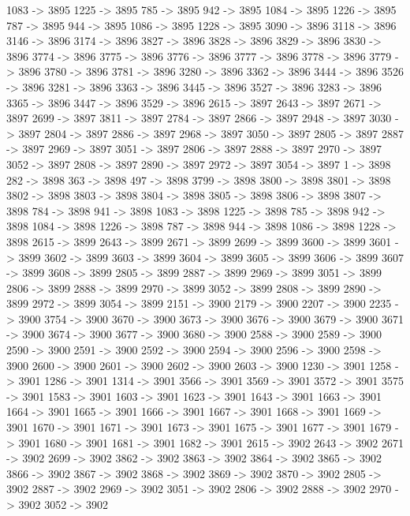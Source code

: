 {	1083 -> 3895
	1225 -> 3895
	785 -> 3895
	942 -> 3895
	1084 -> 3895
	1226 -> 3895
	787 -> 3895
	944 -> 3895
	1086 -> 3895
	1228 -> 3895
	3090 -> 3896
	3118 -> 3896
	3146 -> 3896
	3174 -> 3896
	3827 -> 3896
	3828 -> 3896
	3829 -> 3896
	3830 -> 3896
	3774 -> 3896
	3775 -> 3896
	3776 -> 3896
	3777 -> 3896
	3778 -> 3896
	3779 -> 3896
	3780 -> 3896
	3781 -> 3896
	3280 -> 3896
	3362 -> 3896
	3444 -> 3896
	3526 -> 3896
	3281 -> 3896
	3363 -> 3896
	3445 -> 3896
	3527 -> 3896
	3283 -> 3896
	3365 -> 3896
	3447 -> 3896
	3529 -> 3896
	2615 -> 3897
	2643 -> 3897
	2671 -> 3897
	2699 -> 3897
	3811 -> 3897
	2784 -> 3897
	2866 -> 3897
	2948 -> 3897
	3030 -> 3897
	2804 -> 3897
	2886 -> 3897
	2968 -> 3897
	3050 -> 3897
	2805 -> 3897
	2887 -> 3897
	2969 -> 3897
	3051 -> 3897
	2806 -> 3897
	2888 -> 3897
	2970 -> 3897
	3052 -> 3897
	2808 -> 3897
	2890 -> 3897
	2972 -> 3897
	3054 -> 3897
	1 -> 3898
	282 -> 3898
	363 -> 3898
	497 -> 3898
	3799 -> 3898
	3800 -> 3898
	3801 -> 3898
	3802 -> 3898
	3803 -> 3898
	3804 -> 3898
	3805 -> 3898
	3806 -> 3898
	3807 -> 3898
	784 -> 3898
	941 -> 3898
	1083 -> 3898
	1225 -> 3898
	785 -> 3898
	942 -> 3898
	1084 -> 3898
	1226 -> 3898
	787 -> 3898
	944 -> 3898
	1086 -> 3898
	1228 -> 3898
	2615 -> 3899
	2643 -> 3899
	2671 -> 3899
	2699 -> 3899
	3600 -> 3899
	3601 -> 3899
	3602 -> 3899
	3603 -> 3899
	3604 -> 3899
	3605 -> 3899
	3606 -> 3899
	3607 -> 3899
	3608 -> 3899
	2805 -> 3899
	2887 -> 3899
	2969 -> 3899
	3051 -> 3899
	2806 -> 3899
	2888 -> 3899
	2970 -> 3899
	3052 -> 3899
	2808 -> 3899
	2890 -> 3899
	2972 -> 3899
	3054 -> 3899
	2151 -> 3900
	2179 -> 3900
	2207 -> 3900
	2235 -> 3900
	3754 -> 3900
	3670 -> 3900
	3673 -> 3900
	3676 -> 3900
	3679 -> 3900
	3671 -> 3900
	3674 -> 3900
	3677 -> 3900
	3680 -> 3900
	2588 -> 3900
	2589 -> 3900
	2590 -> 3900
	2591 -> 3900
	2592 -> 3900
	2594 -> 3900
	2596 -> 3900
	2598 -> 3900
	2600 -> 3900
	2601 -> 3900
	2602 -> 3900
	2603 -> 3900
	1230 -> 3901
	1258 -> 3901
	1286 -> 3901
	1314 -> 3901
	3566 -> 3901
	3569 -> 3901
	3572 -> 3901
	3575 -> 3901
	1583 -> 3901
	1603 -> 3901
	1623 -> 3901
	1643 -> 3901
	1663 -> 3901
	1664 -> 3901
	1665 -> 3901
	1666 -> 3901
	1667 -> 3901
	1668 -> 3901
	1669 -> 3901
	1670 -> 3901
	1671 -> 3901
	1673 -> 3901
	1675 -> 3901
	1677 -> 3901
	1679 -> 3901
	1680 -> 3901
	1681 -> 3901
	1682 -> 3901
	2615 -> 3902
	2643 -> 3902
	2671 -> 3902
	2699 -> 3902
	3862 -> 3902
	3863 -> 3902
	3864 -> 3902
	3865 -> 3902
	3866 -> 3902
	3867 -> 3902
	3868 -> 3902
	3869 -> 3902
	3870 -> 3902
	2805 -> 3902
	2887 -> 3902
	2969 -> 3902
	3051 -> 3902
	2806 -> 3902
	2888 -> 3902
	2970 -> 3902
	3052 -> 3902
}
